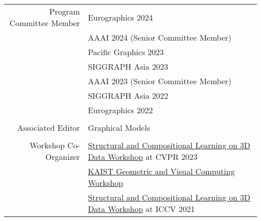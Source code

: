\documentclass[letterpaper,10pt]{article} %
\newcommand{\blankline}{\quad\pagebreak[2]}
\begin{document}
{\begin{tabular}{r|p{11cm}}
Program Committee Member
    & Eurographics 2024\\
    & AAAI 2024 (Senior Committee Member)\\
    & Pacific Graphics 2023\\
    & SIGGRAPH Asia 2023\\
    & AAAI 2023 (Senior Committee Member)\\
    & SIGGRAPH Asia 2022\\
    & Eurographics 2022\\
    &\\
Associated Editor
    & Graphical Models \\
    &\\
Workshop Co-Organizer
    & \href{https://struco3d.github.io/cvpr2023/}{Structural and Compositional Learning on 3D Data Workshop} at CVPR 2023\\
    & \href{https://mhsung.github.io/gvc-workshop-2022/}{KAIST Geometric and Visual Computing Workshop}\\
    & \href{https://struco3d.github.io/iccv2021/}{Structural and Compositional Learning on 3D Data Workshop} at ICCV 2021\\
\end{tabular}\\

\blankline



}
\end{document}
